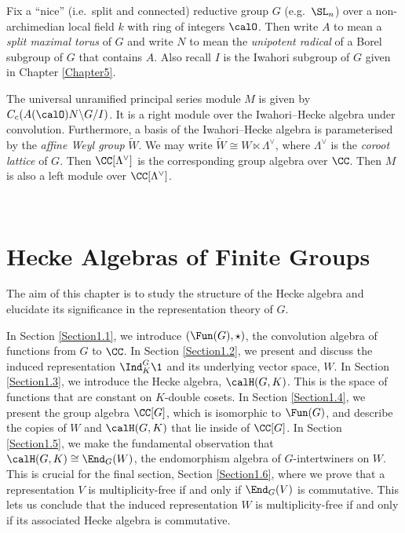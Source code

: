 \documentclass[11pt]{amsart}
\theoremstyle{remark}
\begin{document}
Fix a ``nice'' (i.e.\ split and connected) reductive group $G$ (e.g.\ $\SL_n$) over a non-archimedian local field $k$ with ring of integers $\calO$.
Then write $A$ to mean a \emph{split maximal torus} of $G$ and write $N$ to mean the \emph{unipotent radical} of a Borel subgroup of $G$ that contains $A$.
Also recall $I$ is the Iwahori subgroup of $G$ given in Chapter \ref{Chapter5}.

The universal unramified principal series module $M$ is given by $C_c(A(\calO)N\backslash G/I)$.
It is a right module over the Iwahori--Hecke algebra under convolution.
Furthermore, a basis of the Iwahori--Hecke algebra is parameterised by the \emph{affine Weyl group} $\widetilde{W}$.
We may write $\widetilde{W} \cong W \ltimes \Lambda^\vee$, where $\Lambda^\vee$ is the \emph{coroot lattice} of $G$.
Then $\CC[\Lambda^\vee]$ is the corresponding group algebra over $\CC$.
Then $M$ is also a left module over $\CC[\Lambda^\vee]$.

\newpage
{}

\
\newpage

\section{Hecke Algebras of Finite Groups}\label{Chapter1}
The aim of this chapter is to study the structure of the Hecke algebra and elucidate its significance in the representation theory of $G$.

In Section \ref{Section1.1}, we introduce $(\Fun(G),\star)$, the convolution algebra of functions from $G$ to $\CC$.
In Section \ref{Section1.2}, we present and discuss the induced representation $\Ind_K^G\1$ and its underlying vector space, $W$.
In Section \ref{Section1.3}, we introduce the Hecke algebra, $\calH(G,K)$.
This is the space of functions that are constant on $K$-double cosets.
In Section \ref{Section1.4}, we present the group algebra $\CC[G]$, which is isomorphic to $\Fun(G)$, and describe the copies of $W$ and $\calH(G,K)$ that lie inside of $\CC[G]$.
In Section \ref{Section1.5}, we make the fundamental observation that $\calH(G,K)\cong\End_G(W)$, the endomorphism algebra of $G$-intertwiners on $W$.
This is crucial for the final section, Section \ref{Section1.6}, where we prove that a representation $V$ is multiplicity-free if and only if $\End_G(V)$ is commutative.
This lets us conclude that the induced representation $W$ is multiplicity-free if and only if its associated Hecke algebra is commutative.
\end{document}
